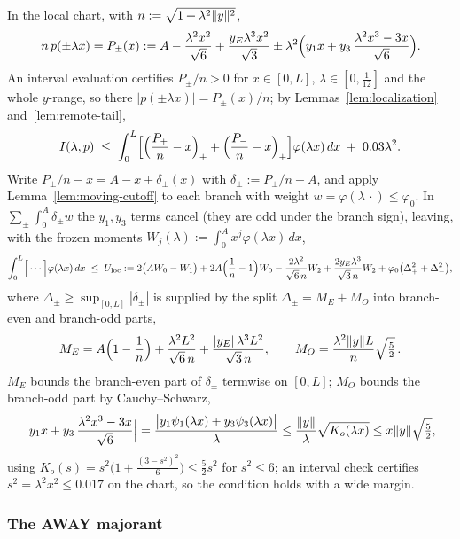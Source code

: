In the local chart, with $n:=\sqrt{1+\lambda^2\lVert y\rVert^2}$,
\[
        n\,p(\pm\lambda x)=P_\pm(x)
        :=A-\frac{\lambda^2x^2}{\sqrt6}+\frac{y_E\lambda^3x^2}{\sqrt3}
        \pm\lambda^2\Bigl(y_1x+y_3\,\frac{\lambda^2x^3-3x}{\sqrt6}\Bigr).
\]
An interval evaluation certifies $P_\pm/n>0$ for $x\in[0,L]$, $\lambda\in[0,\tfrac1{12}]$ and the whole $y$-range, so there $|p(\pm\lambda x)|=P_\pm(x)/n$; by Lemmas~\ref{lem:localization} and~\ref{lem:remote-tail},
\begin{equation}
        I(\lambda,p)\;\le\;\int_0^L\Bigl[\Bigl(\frac{P_+}{n}-x\Bigr)_++\Bigl(\frac{P_-}{n}-x\Bigr)_+\Bigr]\varphi(\lambda x)\,dx
        \;+\;0.03\lambda^2 .
        \label{eq:reserve}
\end{equation}
Write $P_\pm/n-x=A-x+\delta_\pm(x)$ with $\delta_\pm:=P_\pm/n-A$, and apply Lemma~\ref{lem:moving-cutoff} to each branch with weight $w=\varphi(\lambda\,\cdot)\le\varphi_0$. In $\sum_\pm\int_0^A\delta_\pm w$ the $y_1,y_3$ terms cancel (they are odd under the branch sign), leaving, with the frozen moments $W_j(\lambda):=\int_0^Ax^j\varphi(\lambda x)\,dx$,
\[
        \int_0^L\Bigl[\,\cdots\Bigr]\varphi(\lambda x)\,dx
        \;\le\;U_{\mathrm{loc}}
        :=2\bigl(AW_0-W_1\bigr)+2A\Bigl(\frac1n-1\Bigr)W_0
        -\frac{2\lambda^2}{\sqrt6\,n}W_2+\frac{2y_E\lambda^3}{\sqrt3\,n}W_2
        +\varphi_0\bigl(\Delta_+^2+\Delta_-^2\bigr),
\]
where $\Delta_\pm\ge\sup_{[0,L]}|\delta_\pm|$ is supplied by the split $\Delta_\pm=M_E+M_O$ into branch-even and branch-odd parts,
\[
        M_E=A\Bigl(1-\frac1n\Bigr)+\frac{\lambda^2L^2}{\sqrt6\,n}+\frac{|y_E|\,\lambda^3L^2}{\sqrt3\,n},
        \qquad
        M_O=\frac{\lambda^2\lVert y\rVert L}{n}\sqrt{\tfrac52}\,.
\]
$M_E$ bounds the branch-even part of $\delta_\pm$ termwise on $[0,L]$; $M_O$ bounds the branch-odd part by Cauchy--Schwarz,
\[
        \Bigl|y_1x+y_3\,\frac{\lambda^2x^3-3x}{\sqrt6}\Bigr|
        =\frac{\bigl|y_1\psi_1(\lambda x)+y_3\psi_3(\lambda x)\bigr|}{\lambda}
        \le\frac{\lVert y\rVert}{\lambda}\sqrt{K_o(\lambda x)}
        \le x\lVert y\rVert\sqrt{\tfrac52},
\]
using $K_o(s)=s^2\bigl(1+\tfrac{(3-s^2)^2}{6}\bigr)\le\tfrac52s^2$ for $s^2\le6$; an interval check certifies $s^2=\lambda^2x^2\le0.017$ on the chart, so the condition holds with a wide margin.

\subsubsection*{The AWAY majorant}

